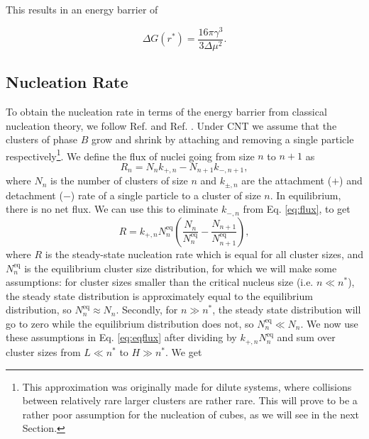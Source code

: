 \documentclass[thesis]{subfiles}
\begin{document}
This results in an energy barrier of 

\begin{equation}
	\Delta G (r^*) = \frac{16 \pi \gamma^3}{3 \Delta\mu^2}.
\end{equation}

\subsection{Nucleation Rate} \label{subsec:nucl rate}

To obtain the nucleation rate in terms of the energy barrier from classical nucleation theory, we follow Ref. \cite{valeriani2007numerical} and Ref. \cite{auer2004quantitative}. Under CNT we assume that the clusters of phase $B$ grow and shrink by attaching and removing a single particle respectively\footnote{This  approximation was originally made for dilute systems\cite{katz1992homogeneous}, where collisions between relatively rare larger clusters are rather rare. This will prove to be a rather poor assumption for the nucleation of cubes, as we will see in the next Section.}. %
We define the flux of nuclei going from size $n$ to $n+1$ as \cite{valeriani2007numerical} 
\begin{equation}\label{eq:flux}
	R_n = N_n k_{+, n} - N_{n + 1} k_{-, n + 1},
\end{equation}
where $N_n$ is the number of clusters of size $n$ and $k_{\pm, n}$ are the attachment ($+$) and detachment ($-$) rate of a single particle to a cluster of size $n$. %
In equilibrium, there is no net flux. We can use this to eliminate $k_{-, n}$ from Eq. \ref{eq:flux}, to get
\begin{equation} \label{eq:eqflux}
	R = k_{+, n} N_n^\textrm{eq} \left( \frac{N_n}{N_n^\textrm{eq}} - \frac{N_{n + 1}}{N_{n + 1}^\textrm{eq}} \right),
\end{equation}
where $R$ is the steady-state nucleation rate which is equal for all cluster sizes, and $N_n^\textrm{eq}$ is the equilibrium cluster size distribution, for which we will make some assumptions: for cluster sizes smaller than the critical nucleus size (i.e. $n \ll n^*$), the steady state distribution is approximately equal to the equilibrium distribution, so $N_n^\textrm{eq} \approx N_n$. Secondly, for $n \gg n^*$, the steady state distribution will go to zero while the equilibrium distribution does not, so $N_n^\textrm{eq} \ll N_n$. We now use these assumptions in Eq. \ref{eq:eqflux} after dividing by $k_{+, n} N_n^\textrm{eq}$ and sum over cluster sizes from $L \ll n^*$ to $H \gg n^*$. We get
\end{document}
